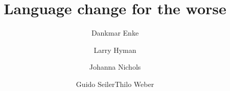 \title{Language change for the worse}
\author{Dankmar Enke\and Larry Hyman\and Johanna Nichols\and Guido Seiler\lastand Thilo Weber}
\renewcommand{\lsSeries}{sidl}%
\renewcommand{\lsSeriesNumber}{}
\renewcommand{\lsID}{292}
\lsCoverTitleSizes{51.5pt}{17pt}
